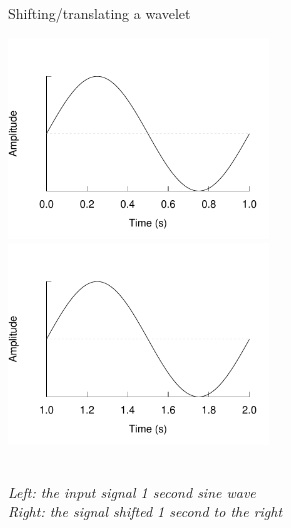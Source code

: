 \begin{figure}[h]
\caption{Shifting/translating a wavelet}\label{figure:shifting}
\caption*{\\[1em]\emph{Left: the input signal 1 second sine wave\\ Right: the
signal shifted 1 second to the right}\rm}
\centering
	\includegraphics[width=196pt]{images/sine_full.pdf}
	\hspace{1em}
	\includegraphics[width=196pt]{images/sine_shifted.pdf}
\end{figure}